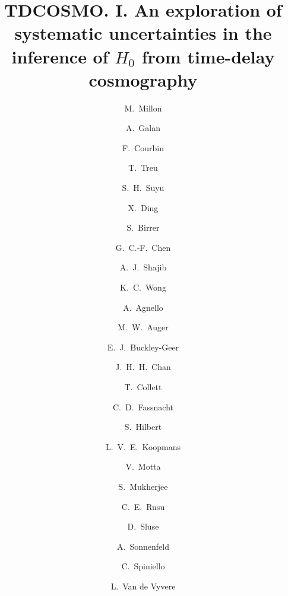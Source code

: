 \documentclass[traditabstract, twocolumns, longauth]{aa}
\newcommand{\Hc}{\ensuremath{H_0}\xspace}
\begin{document}
 


\title{
TDCOSMO. I. An exploration of systematic uncertainties in the inference of \Hc from time-delay cosmography 
}
\author{
M.~Millon\inst{\ref{epfl}} \and
A.~Galan\inst{\ref{epfl}} \and
F.~Courbin\inst{\ref{epfl}} \and
T.~Treu\inst{\ref{ucla}} \and
S.~H.~Suyu\inst{\ref{mpa},\ref{tum},\ref{asiaa}} \and
X.~Ding\inst{\ref{ucla}} \and
S.~Birrer\inst{\ref{stanford}} \and
G.~C.-F.~Chen \inst{\ref{ucdavis}} \and
A.~J.~Shajib \inst{\ref{ucla}} \and
K.~C.~Wong \inst{\ref{kavliipmu}} \and
A.~Agnello\inst{\ref{dark}} \and
M.~W.~Auger\inst{\ref{ucambridge},\ref{kavlicambridge}} \and
E.~J.~Buckley-Geer\inst{\ref{Fermilab}} \and
J.~H.~H.~Chan\inst{\ref{epfl}}\and
T.~Collett\inst{\ref{uportsmouth}} \and
C.~D.~Fassnacht \inst{\ref{ucdavis}} \and
S.~Hilbert \inst{\ref{mpa}} \and
L.~V.~E.~Koopmans\inst{\ref{unigroningen}}\and 
V.~Motta \inst{\ref{universidadvalparaiso}} \and
S.~Mukherjee \inst{\ref{star}}\and
C.~E.~Rusu \inst{\ref{naoj}} \and
D.~Sluse\inst{\ref{star}} \and
A.~Sonnenfeld \inst{\ref{leiden}} \and
C.~Spiniello \inst{\ref{OAC},\ref{ESO}} \and
L.~Van de Vyvere\inst{\ref{star}} 
}
\end{document}
